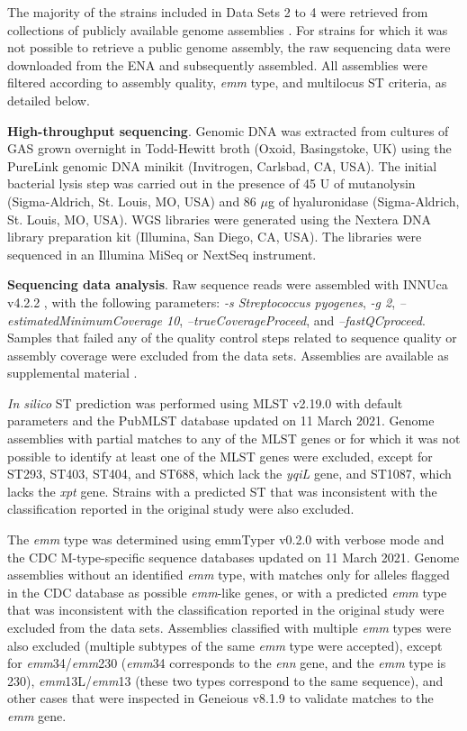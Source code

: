 The majority of the strains included in Data Sets 2 to 4 \cite{friaes_supplemental_2023} were retrieved from collections of publicly available genome assemblies \cite{blackwell_exploring_2021, oleary_reference_2016}. For strains for which it was not possible to retrieve a public genome assembly, the raw sequencing data were downloaded from the \ac{ENA} and subsequently assembled. All assemblies were filtered according to assembly quality, \textit{emm} type, and multilocus \ac{ST} criteria, as detailed below.

\textbf{High-throughput sequencing}. Genomic DNA was extracted from cultures of \ac{GAS} grown overnight in Todd-Hewitt broth (Oxoid, Basingstoke, UK) using the PureLink genomic DNA minikit (Invitrogen, Carlsbad, CA, USA). The initial bacterial lysis step was carried out in the presence of 45 U of mutanolysin (Sigma-Aldrich, St. Louis, MO, USA) and 86 $\mu$g of hyaluronidase (Sigma-Aldrich, St. Louis, MO, USA). \ac{WGS} libraries were generated using the Nextera DNA library preparation kit (Illumina, San Diego, CA, USA). The libraries were sequenced in an Illumina MiSeq or NextSeq instrument.

\textbf{Sequencing data analysis}. Raw sequence reads were assembled with INNUca v4.2.2 \cite{noauthor_release_nodate}, with the following parameters: \textit{-s Streptococcus pyogenes}, \textit{-g 2}, \textit{–estimatedMinimumCoverage 10}, \textit{–trueCoverageProceed}, and \textit{–fastQCproceed}. Samples that failed any of the quality control steps related to sequence quality or assembly coverage were excluded from the data sets. Assemblies are available as supplemental material \cite{friaes_supplemental_2023}.

\textit{In silico} \ac{ST} prediction was performed using MLST v2.19.0 \cite{seemann_mlst_nodate} with default parameters and the PubMLST database updated on 11 March 2021. Genome assemblies with partial matches to any of the \ac{MLST} genes or for which it was not possible to identify at least one of the \ac{MLST} genes were excluded, except for ST293, ST403, ST404, and ST688, which lack the \textit{yqiL} gene, and ST1087, which lacks the \textit{xpt} gene. Strains with a predicted \ac{ST} that was inconsistent with the classification reported in the original study were also excluded.

The \textit{emm} type was determined using emmTyper v0.2.0 \cite{noauthor_release_nodate-2} with verbose mode and the \ac{CDC} M-type-speciﬁc sequence databases updated on 11 March 2021. Genome assemblies without an identified \textit{emm} type, with matches only for alleles flagged in the \ac{CDC} database as possible \textit{emm}-like genes, or with a predicted \textit{emm} type that was inconsistent with the classification reported in the original study were excluded from the data sets. Assemblies classified with multiple \textit{emm} types were also excluded (multiple subtypes of the same \textit{emm} type were accepted), except for \textit{emm}34/\textit{emm}230 (\textit{emm}34 corresponds to the \textit{enn} gene, and the \textit{emm} type is 230), \textit{emm}13L/\textit{emm}13 (these two types correspond to the same sequence), and other cases that were inspected in Geneious v8.1.9 to validate matches to the \textit{emm} gene.

